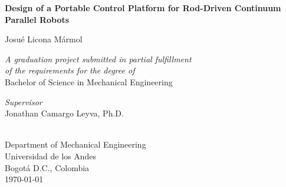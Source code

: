 \begin{titlepage}
    \begin{spacing}{1}
    \hypertarget{titlepage}{} %
    \begin{center}
        \vspace*{0.5cm}

        \LARGE
        \textbf{Design of a Portable Control Platform for Rod-Driven Continuum Parallel Robots}

        \vspace{2cm}
        \Large
        Josué Licona Mármol

        \large
        \vspace{1.5cm}
        \textit{A graduation project submitted in partial fulfillment \\
        of the requirements for the degree of} \\
        \vspace{0.5cm}
        Bachelor of Science in Mechanical Engineering

        \vspace{1.5cm}
        \textit{Supervisor} \\
        Jonathan Camargo Leyva, Ph.D.

        \vspace{1cm}
        \vspace{1cm}
        \\
        Department of Mechanical Engineering\\
        Universidad de los Andes\\
        Bogotá D.C., Colombia\\
        \today
    \end{center}
    \end{spacing}
\end{titlepage}
\setcounter{page}{2}
\normalsize